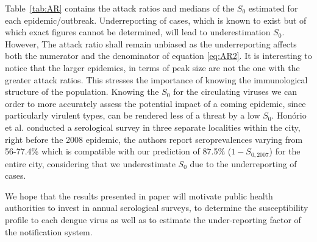 \documentclass[10pt]{article}
\begin{document}
Table~\ref{tab:AR} contains the attack ratios and medians of the $S_0$ 
estimated for each epidemic/outbreak.
 Underreporting of cases, which is known to exist but of which exact figures 
cannot be determined, will lead to underestimation $S_0$. However, The attack 
ratio shall remain unbiased as the underreporting affects both the numerator and 
the denominator of equation \ref{eq:AR2}.
It is interesting to notice that the larger epidemics, in terms of peak size 
are not the one with the greater attack ratios.
This stresses the importance of knowing the immunological structure of the 
population. Knowing the $S_0$ for the circulating viruses we can order to more 
accurately assess the potential impact of a coming epidemic, since particularly 
virulent types, can be rendered less of a threat by a low $S_0$. Hon\'orio et 
al.\citep{honorio2009spatial} conducted a serological survey in three separate 
localities within the city, right before the 2008 epidemic, the authors report 
seroprevalences varying from 56-77.4\% which is compatible with our prediction 
of 87.5\% ($1-S_{0,2007}$) for the entire city, considering that we 
underestimate $S_0$ due to the underreporting of cases.

We hope that the results presented in paper will motivate public 
health authorities to invest in annual serological surveys, to determine the 
susceptibility profile to each dengue virus as well as to estimate the 
under-reporting factor of the notification system.
\end{document}
